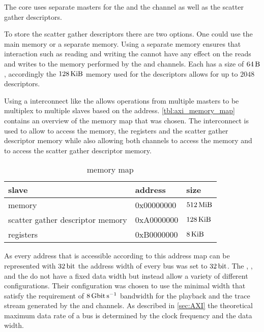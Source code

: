 The \AXIDMA{} core uses separate \AXI{} masters for the \SToMM{} and the \MMToS{} channel as well as the scatter gather descriptors.

To store the scatter gather descriptors there are two options. One could use the main \DDR{} memory or a separate memory. Using a separate memory ensures that interaction such as reading and writing the \descriptor{} cannot have any effect on the reads and writes to the \DDR{} memory performed by the \SToMM{} and \MMToS{} channels.
Each \descriptor{} has a size of $\SI{64}{\byte}$, accordingly the $\SI{128}{\kibi\byte}$ memory used for the descriptors allows for up to $\num{2048}$ descriptors.

Using a \AXI{} interconnect like the \smartconnect{} allows operations from multiple \AXI{} masters to be multiplex to multiple \AXI{} slaves based on the address. \autoref{tbl:axi_memory_map} contains an overview of the memory map that was chosen. The interconnect is used to allow \FAXI{} to access the \DDR{} memory, the \AXIDMA{} registers and the scatter gather descriptor memory while also allowing both \AXIDMA{} channels to access the \DDR{} memory and \AXIDMA{} to access the scatter gather descriptor memory.

\begin{table}
\begin{center}
\begin{tabular}{lll}
\toprule
  \AXI{} slave & address & size \\
  \midrule
  \DDR{} memory & 0x00000000 & $\SI{512}{\mebi\byte}$ \\
  scatter gather descriptor memory & 0xA0000000 & $\SI{128}{\kibi\byte}$ \\
  \AXIDMA{} registers & 0xB0000000 & $\SI{8}{\kibi\byte}$ \\
  \bottomrule
\end{tabular}
\end{center}
\caption{\AXI{} memory map}\label{tbl:axi_memory_map}
\end{table}

As every address that is accessible according to this address map can be represented with $\SI{32}{\bit}$ the address width of every \AXI{} bus was set to $\SI{32}{\bit}$.
The \AXIDMA{}, \XilinxMIG{}, \smartconnect{} and the \bramctrl{} do not have a fixed \AXI{} data width but instead allow a variety of different configurations.
Their configuration was chosen to use the minimal width that satisfy the requirement of $\pbExecBandwidth{}$ bandwidth for the playback and the trace stream generated by the \MMToS{} and \SToMM{} channels.
As described in \autoref{sec:AXI} the theoretical maximum data rate of a \AXI{} bus is determined by the clock frequency and the data width.

